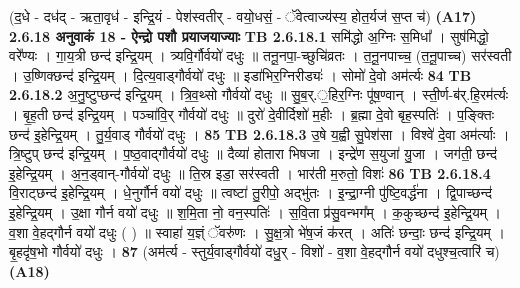 \documentclass[17pt]{extarticle}
\begin{document}
                                (द॒धे - दध॑द् - ऋता॒वृध॑ - इन्द्रि॒यं - पेश॑स्वतीर् - वयो॒धसं॒ - ॅवेत्वाज्य॑स्य॒ होत॒र्यज॑ स॒प्त च॑) \textbf{(A17)} \newline \newline
                \textbf{ 2.6.18    अनुवाकं   18 - ऐन्द्रो पशौ प्रयाजयाज्याः} \newline
                                \textbf{ TB 2.6.18.1} \newline
                  समि॑द्धो अ॒ग्निः स॒मिधा᳚ । सुष॑मिद्धो॒ वरे᳚ण्यः । गा॒य॒त्री छन्द॑ इन्द्रि॒यम् । त्र्यवि॒र्गौर्वयो॑ दधुः ॥ तनू॒नपा॒-च्छुचि॑व्रतः । त॒नू॒नपाच्च॒ (त॒नू॒पाच्च) सर॑स्वती । उ॒ष्णिक्छन्द॑ इन्द्रि॒यम् । दि॒त्य॒वाड्गौर्वयो॑ दधुः ॥ इडा॑भिर॒ग्निरीड्यः॑ । सोमो॑ दे॒वो अम॑र्त्यः \textbf{ 84} \newline
                  \newline
                                \textbf{ TB 2.6.18.2} \newline
                  अ॒नु॒ष्टुप्छन्द॑ इन्द्रि॒यम् । त्रि॒व॒थ्सो गौर्वयो॑ दधुः ॥ सु॒ब॒र्.॒हिर॒ग्निः पू॑ष॒ण्वान् । स्ती॒र्ण-ब॑र्.हि॒रम॑र्त्यः । बृ॒ह॒ती छन्द॑ इन्द्रि॒यम् । पञ्चा॑वि॒र् गौर्वयो॑ दधुः ॥ दुरो॑ दे॒वीर्दिशो॑ म॒हीः । ब्र॒ह्मा दे॒वो बृह॒स्पतिः॑ । प॒ङ्क्तिः छन्द॑ इ॒हेन्द्रि॒यम् । तु॒र्य॒वाड् गौर्वयो॑ दधुः । \textbf{ 85} \newline
                  \newline
                                \textbf{ TB 2.6.18.3} \newline
                  उ॒षे य॒ह्वी सु॒पेश॑सा । विश्वे॑ दे॒वा अम॑र्त्याः । त्रि॒ष्टुप् छन्द॑ इन्द्रि॒यम् । प॒ष्ठ॒वाद्गौर्वयो॑ दधुः ॥ दैव्या॑ होतारा भिषजा । इन्द्रे॑ण स॒युजा॑ यु॒जा । जग॑ती॒ छन्द॑ इ॒हेन्द्रि॒यम् । अ॒न॒ड्वान्-गौर्वयो॑ दधुः ॥ ति॒स्र इडा॒ सर॑स्वती । भार॑ती म॒रुतो॒ विशः॑ \textbf{ 86} \newline
                  \newline
                                \textbf{ TB 2.6.18.4} \newline
                  वि॒राट्छन्द॑ इ॒हेन्द्रि॒यम् । धे॒नुर्गौर्न वयो॑ दधुः ॥ त्वष्टा॑ तु॒रीपो॒ अद्भु॑तः । इ॒न्द्रा॒ग्नी पु॑ष्टि॒वर्द्ध॑ना । द्वि॒पाच्छन्द॑ इ॒हेन्द्रि॒यम् । उ॒क्षा गौर्न वयो॑ दधुः ॥ श॒मि॒ता नो॒ वन॒स्पतिः॑ । स॒वि॒ता प्र॑सु॒वन्भग᳚म् । क॒कुच्छन्द॑ इ॒हेन्द्रि॒यम् । व॒शा वे॒हद्गौर्न वयो॑ दधुः ( ) ॥ स्वाहा॑ य॒ज्ञ्ं ॅवरु॑णः । सु॒क्ष॒त्रो भे॑ष॒जं क॑रत् । अतिः॑ छन्दाः॒ छन्द॑ इन्द्रि॒यम् । बृ॒हदृ॑ष॒भो गौर्वयो॑ दधुः । \textbf{ 87} \newline
                  \newline
                                    (अम॑र्त्य - स्तुर्य॒वाड्गौर्वयो॑ दधु॒र् - विशो॑ - व॒शा वे॒हद्गौर्न वयो॑ दधुश्च॒त्वारि॑ च) \textbf{(A18)} \newline \newline
\end{document}
